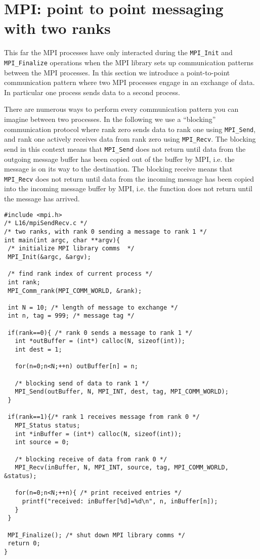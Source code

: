 \section{MPI: point to point messaging with two ranks}

This far the MPI processes have only interacted during the \texttt{MPI\_Init} and \texttt{MPI\_Finalize} operations when the MPI library sets up communication patterns between the MPI processes. In this section we introduce a point-to-point communication pattern where two MPI processes engage in an exchange of data. In particular one process sends data to a second process.

There are numerous ways to perform every  communication pattern you can imagine between two processes. In the following we use a ``blocking'' communication protocol where rank zero sends data to rank one using \texttt{MPI\_Send}, and rank one actively receives data from rank zero using \texttt{MPI\_Recv}. The blocking send in this context means that \texttt{MPI\_Send} does not return until data from the outgoing message buffer has been copied out of the buffer by MPI, i.e. the message is on its way to the destination. The blocking receive means that \texttt{MPI\_Recv} does not return until data from the incoming message has been copied into the incoming message buffer by MPI, i.e. the function does not return until the message has arrived.

\begin{verbatim}
#include <mpi.h>
/* L16/mpiSendRecv.c */
/* two ranks, with rank 0 sending a message to rank 1 */
int main(int argc, char **argv){
 /* initialize MPI library comms  */
 MPI_Init(&argc, &argv);
 
 /* find rank index of current process */
 int rank;
 MPI_Comm_rank(MPI_COMM_WORLD, &rank);

 int N = 10; /* length of message to exchange */
 int n, tag = 999; /* message tag */
   
 if(rank==0){ /* rank 0 sends a message to rank 1 */
   int *outBuffer = (int*) calloc(N, sizeof(int));
   int dest = 1;
   
   for(n=0;n<N;++n) outBuffer[n] = n; 
   
   /* blocking send of data to rank 1 */
   MPI_Send(outBuffer, N, MPI_INT, dest, tag, MPI_COMM_WORLD);
 }
 
 if(rank==1){/* rank 1 receives message from rank 0 */
   MPI_Status status;
   int *inBuffer = (int*) calloc(N, sizeof(int));
   int source = 0;
   
   /* blocking receive of data from rank 0 */
   MPI_Recv(inBuffer, N, MPI_INT, source, tag, MPI_COMM_WORLD, &status);
   
   for(n=0;n<N;++n){ /* print received entries */
     printf("received: inBuffer[%d]=%d\n", n, inBuffer[n]);
   }
 }
 
 MPI_Finalize(); /* shut down MPI library comms */
 return 0;
}
\end{verbatim} 

